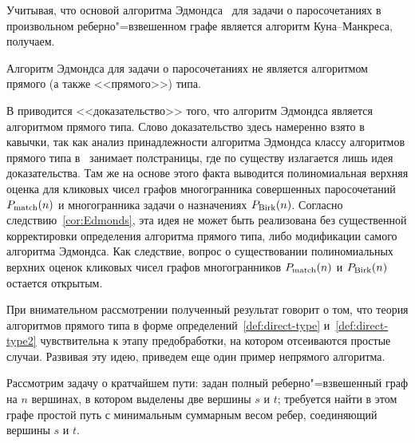 Учитывая, что основой алгоритма Эдмондса~\cite{Edmonds:1965} для задачи о паросочетаниях в произвольном реберно"=взвешенном графе является алгоритм Куна--Манкреса, получаем.

\begin{corollary}
\label{cor:Edmonds}
	Алгоритм Эдмондса для задачи о паросочетаниях не является
	алгоритмом прямого (а также <<прямого>>) типа.
\end{corollary}

\begin{remark}
В \cite[теорема 2.5.2]{BondarenkoDiss:1993} приводится <<доказательство>> того, что алгоритм Эдмондса является алгоритмом прямого типа. Слово доказательство здесь намеренно взято в кавычки, так как анализ принадлежности алгоритма Эдмондса классу алгоритмов прямого типа в~\cite{BondarenkoDiss:1993} занимает полстраницы, где по существу излагается лишь идея доказательства.
Там же на основе этого факта выводится полиномиальная верхняя оценка для кликовых чисел графов многогранника совершенных паросочетаний $P_{\textup{match}}(n)$ и многогранника задачи о назначениях $P_{\textup{Birk}}(n)$.
Согласно следствию~\ref{cor:Edmonds}, эта идея не может быть реализована без существенной корректировки определения алгоритма прямого типа, либо модификации самого алгоритма Эдмондса. Как следствие, вопрос о существовании полиномиальных верхних оценок кликовых чисел графов многогранников $P_{\textup{match}}(n)$ и $P_{\textup{Birk}}(n)$ остается открытым.
\end{remark}

При внимательном рассмотрении полученный результат говорит о том,
что теория алгоритмов прямого типа в форме определений~\ref{def:direct-type}
и~\ref{def:direct-type2} чувствительна к этапу предобработки,
на котором отсеиваются простые случаи.
Развивая эту идею, приведем еще один пример непрямого алгоритма.

Рассмотрим задачу о кратчайшем пути:
задан полный реберно"=взвешенный граф на $n$ вершинах,
в котором выделены две вершины $s$ и $t$;
требуется найти в этом графе простой путь с минимальным суммарным весом ребер, соединяющий вершины $s$ и $t$.

